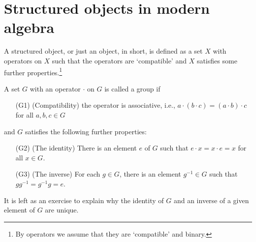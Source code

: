\section{Structured objects in modern algebra}

A structured object, or just an object, in short, is defined as a set $X$ with operators on $X$ such that the operators are `compatible' and $X$ satisfies some further properties.\footnote{By operators we assume that they are `compatible' and binary.}

\begin{defi}[Group]
    A set $G$ with an operator $\cdot$ on $G$ is called a group if
    \begin{enumerate}
        \item[(G1)]
        {
            (Compatibility)
            the operator is associative, i.e., $a\cdot(b\cdot c)=(a\cdot b)\cdot c$ for all $a, b, c\in G$
        }
    \end{enumerate}
    and $G$ satisfies the following further properties:
    \begin{enumerate}
        \item[(G2)]
        {
            (The identity)
            There is an element $e$ of $G$ such that $e\cdot x=x\cdot e=x$ for all $x\in G$.
        }
        \item[(G3)]
        {
            (The inverse)
            For each $g\in G$, there is an element $g^{-1}\in G$ such that $gg^{-1}=g^{-1}g=e$.
        }
    \end{enumerate}
    \color{brown}It is left as an exercise to explain why the identity of $G$ and an inverse of a given element of $G$ are unique.\color{black}
\end{defi}

